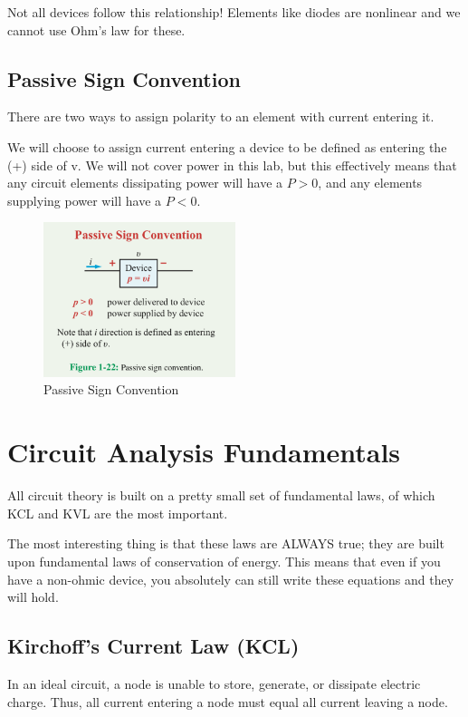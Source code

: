 \documentclass{article}
\begin{document}
Not all devices follow this relationship! Elements like diodes are nonlinear and we cannot use Ohm's law for these.

\subsection{Passive Sign Convention}
There are two ways to assign polarity to an element with current entering it.

We will choose to assign current entering a device to be defined as entering the
(+) side of v. We will not cover power in this lab, but this effectively means
that any circuit elements dissipating power will have a $P > 0$, and any
elements supplying power will have a $P < 0$.

\begin{figure}[!htbp]
\centering
\includegraphics[width=0.5\textwidth]{fig_1-22}
\caption{Passive Sign Convention}
\label{fig:passive_convention}
\end{figure}

\section{Circuit Analysis Fundamentals}
All circuit theory is built on a pretty small set of fundamental laws, of which KCL and KVL are the most important.

The most interesting thing is that these laws are ALWAYS true; they are built upon fundamental laws of conservation of energy. This means that even if you have a non-ohmic device, you absolutely can still write these equations and they will hold.
\subsection{Kirchoff's Current Law (KCL)}
In an ideal circuit, a node is unable to store, generate, or dissipate electric charge. Thus, all current entering a node must equal all current leaving a node.
\end{document}
